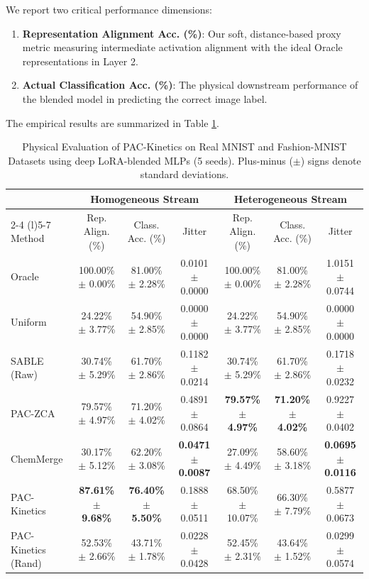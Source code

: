 We report two critical performance dimensions:
\begin{enumerate}
    \item \textbf{Representation Alignment Acc. (\%)}: Our soft, distance-based proxy metric measuring intermediate activation alignment with the ideal Oracle representations in Layer 2.
    \item \textbf{Actual Classification Acc. (\%)}: The physical downstream performance of the blended model in predicting the correct image label.
\end{enumerate}
The empirical results are summarized in Table \ref{tab:physical_results}.

\begin{table}[tb]
\centering
\small
\setlength{\tabcolsep}{1.5pt}
\caption{Physical Evaluation of \textsf{PAC-Kinetics} on Real MNIST and Fashion-MNIST Datasets using deep LoRA-blended MLPs (5 seeds). Plus-minus ($\pm$) signs denote standard deviations.}
\label{tab:physical_results}
\vskip 0.1in
\begin{tabular}{lcccccc}
\toprule
 & \multicolumn{3}{c}{\textbf{Homogeneous Stream}} & \multicolumn{3}{c}{\textbf{Heterogeneous Stream}} \\
\cmidrule(r){2-4} \cmidrule(l){5-7}
Method & Rep. Align. (\%) & Class. Acc. (\%) & Jitter & Rep. Align. (\%) & Class. Acc. (\%) & Jitter \\
\midrule
Oracle & 100.00\% $\pm$ 0.00\% & 81.00\% $\pm$ 2.28\% & 0.0101 $\pm$ 0.0000 & 100.00\% $\pm$ 0.00\% & 81.00\% $\pm$ 2.28\% & 1.0151 $\pm$ 0.0744 \\
Uniform & 24.22\% $\pm$ 3.77\% & 54.90\% $\pm$ 2.85\% & 0.0000 $\pm$ 0.0000 & 24.22\% $\pm$ 3.77\% & 54.90\% $\pm$ 2.85\% & 0.0000 $\pm$ 0.0000 \\
SABLE (Raw) & 30.74\% $\pm$ 5.29\% & 61.70\% $\pm$ 2.86\% & 0.1182 $\pm$ 0.0214 & 30.74\% $\pm$ 5.29\% & 61.70\% $\pm$ 2.86\% & 0.1718 $\pm$ 0.0232 \\
PAC-ZCA & 79.57\% $\pm$ 4.97\% & 71.20\% $\pm$ 4.02\% & 0.4891 $\pm$ 0.0864 & \textbf{79.57\% $\pm$ 4.97\%} & \textbf{71.20\% $\pm$ 4.02\%} & 0.9227 $\pm$ 0.0402 \\
ChemMerge & 30.17\% $\pm$ 5.12\% & 62.20\% $\pm$ 3.08\% & \textbf{0.0471 $\pm$ 0.0087} & 27.09\% $\pm$ 4.49\% & 58.60\% $\pm$ 3.18\% & \textbf{0.0695} $\pm$ \textbf{0.0116} \\
PAC-Kinetics & \textbf{87.61\% $\pm$ 9.68\%} & \textbf{76.40\% $\pm$ 5.50\%} & 0.1888 $\pm$ 0.0511 & 68.50\% $\pm$ 10.07\% & 66.30\% $\pm$ 7.79\% & 0.5877 $\pm$ 0.0673 \\
PAC-Kinetics (Rand) & 52.53\% $\pm$ 2.66\% & 43.71\% $\pm$ 1.78\% & 0.0228 $\pm$ 0.0428 & 52.45\% $\pm$ 2.31\% & 43.64\% $\pm$ 1.52\% & 0.0299 $\pm$ 0.0574 \\
\bottomrule
\end{tabular}
\end{table}

